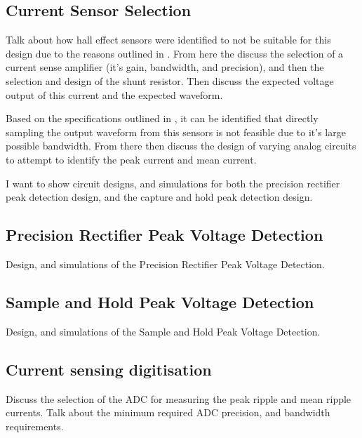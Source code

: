 \subsection{Current Sensor Selection}\label{S:current_sense_selection}

Talk about how hall effect sensors were identified to not be suitable for this design due to the reasons outlined in . From here the discuss the selection of a current sense amplifier (it's gain, bandwidth, and precision), and then the selection and design of the shunt resistor. Then discuss the expected voltage output of this current and the expected waveform. 


Based on the specifications outlined in , it can be identified that directly sampling the output waveform from this sensors is not feasible due to it's large possible bandwidth. From there then discuss the design of varying analog circuits to attempt to identify the peak current and mean current. 

I want to show circuit designs, and simulations for both the precision rectifier peak detection design, and the capture and hold peak detection design. 

\subsection{Precision Rectifier Peak Voltage Detection}\label{S:current_sense_precision_rectifier_design}

Design, and simulations of the Precision Rectifier Peak Voltage Detection.

\subsection{Sample and Hold Peak Voltage Detection}\label{S:current_sense_sample_and_hold_design}

Design, and simulations of the Sample and Hold Peak Voltage Detection.

\subsection{Current sensing digitisation}\label{S:current_sense_ADC_design}

Discuss the selection of the ADC for measuring the peak ripple and mean ripple currents. Talk about the minimum required ADC precision, and bandwidth requirements.  


%
%


